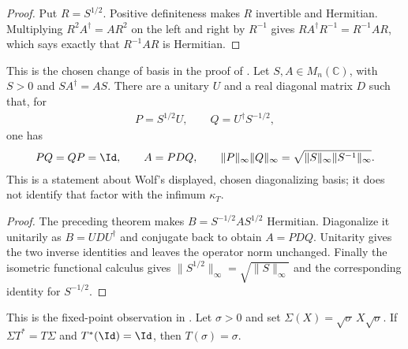 \begin{proof}
    \leanok
    Put $R=S^{1/2}$.  Positive definiteness makes $R$ invertible and
    Hermitian.  Multiplying $R^2A^\dagger=AR^2$ on the left and right by
    $R^{-1}$ gives
    $RA^\dagger R^{-1}=R^{-1}AR$, which says exactly that
    $R^{-1}AR$ is Hermitian.
\end{proof}

\begin{theorem}
    \label{thm:detailed_balance_diagonalizing_similarity}
    \leanok
    This is the chosen change of basis in the proof of
    \cite[Chapter~8, Proposition ``Jordan condition number and detailed balance'']{Wolf2012Quantum}.
    Let $S,A\in M_n(\mathbb C)$, with $S>0$ and
    $SA^\dagger=AS$.  There are a unitary $U$ and a real diagonal matrix
    $D$ such that, for
    \begin{align}
        P=S^{1/2}U,
        \qquad
        Q=U^\dagger S^{-1/2},
    \end{align}
    one has
    \begin{align}
        PQ=QP=\Id,
        \qquad
        A=PDQ,
        \qquad
        \lVert P\rVert_\infty\lVert Q\rVert_\infty
        =\sqrt{\lVert S\rVert_\infty\lVert S^{-1}\rVert_\infty}.
    \end{align}
    This is a statement about Wolf's displayed, chosen diagonalizing basis;
    it does not identify that factor with the infimum $\kappa_T$.
\end{theorem}

\begin{proof}
    \leanok
    The preceding theorem makes $B=S^{-1/2}AS^{1/2}$ Hermitian.  Diagonalize
    it unitarily as $B=UDU^\dagger$ and conjugate back to obtain $A=PDQ$.
    Unitarity gives the two inverse identities and leaves the operator norm
    unchanged.  Finally the isometric functional calculus gives
    $\lVert S^{1/2}\rVert_\infty=\sqrt{\lVert S\rVert_\infty}$ and the
    corresponding identity for $S^{-1/2}$.
\end{proof}

\begin{theorem}
    \label{thm:detailed_balance_sigma_fixed_point}
    \leanok
    This is the fixed-point observation in
    \cite[Chapter~8, Proposition ``Jordan condition number and detailed balance'']{Wolf2012Quantum}.
    Let $\sigma>0$ and set
    $\Sigma(X)=\sqrt\sigma\,X\sqrt\sigma$.  If
    $\Sigma T^*=T\Sigma$ and $T^*(\Id)=\Id$, then $T(\sigma)=\sigma$.
\end{theorem}

